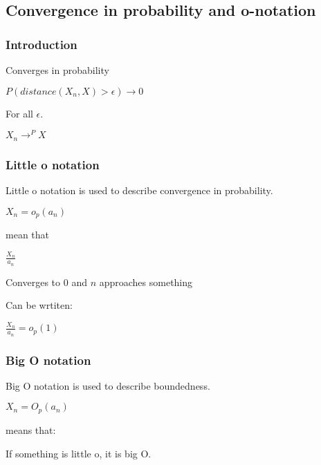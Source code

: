 
\subsection{Convergence in probability and o-notation}

\subsubsection{Introduction}

Converges in probability

\(P(distance(X_n, X)>\epsilon )\rightarrow 0\)

For all \(\epsilon \).

\(X_n \rightarrow^P X\)

\subsubsection{Little o notation}

Little o notation is used to describe convergence in probability.

\(X_n=o_p(a_n)\)

mean that

\(\frac{X_n}{a_n}\)

Converges to \(0\) and \(n\) approaches something

Can be wrtiten:

\(\frac{X_n}{a_n}=o_p(1)\)

\subsubsection{Big O notation}

Big O notation is used to describe boundedness.

\(X_n=O_p(a_n)\)

means that:

If something is little o, it is big O.

